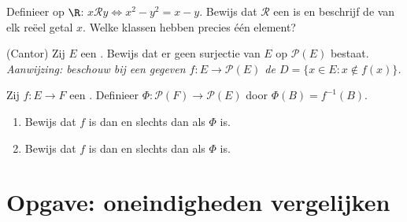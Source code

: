 \begin{exercise}[$\star\star$]\label{exo:b1:logic:10}
Definieer op $\R$: $x \mathbin{\mathcal{R}} y \iff x^2 - y^2 = x - y$.
Bewijs dat $\mathcal{R}$ een  is en beschrijf de
 van elk reëel getal $x$. Welke klassen hebben precies
één element?
\end{exercise}

\begin{exercise}[$\star\star\star$]\label{exo:b1:logic:11}
(Cantor) Zij $E$ een . Bewijs dat er geen surjectie van $E$ op
$\mathcal{P}(E)$ bestaat. \emph{Aanwijzing: beschouw bij een gegeven $f
\colon E \to \mathcal{P}(E)$ de  $D = \{x \in E : x \notin
f(x)\}$.}
\end{exercise}

\begin{exercise}[$\star\star\star$]\label{exo:b1:logic:12}
Zij $f \colon E \to F$ een . Definieer $\Phi \colon
\mathcal{P}(F) \to \mathcal{P}(E)$ door $\Phi(B) = f^{-1}(B)$.
\begin{enumerate}
  \item Bewijs dat $f$  is dan en slechts dan als $\Phi$
         is.
  \item Bewijs dat $f$  is dan en slechts dan als $\Phi$
         is.
\end{enumerate}
\end{exercise}

\section{Opgave: oneindigheden vergelijken}

